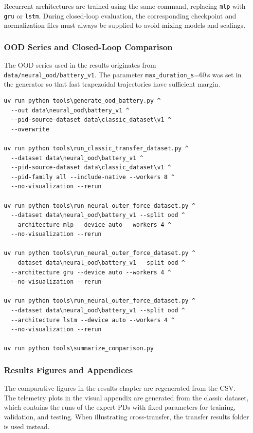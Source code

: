 Recurrent architectures are trained using the same command, replacing \texttt{mlp} with \texttt{gru} or \texttt{lstm}. During closed-loop evaluation, the corresponding checkpoint and normalization files must always be supplied to avoid mixing models and scalings.

\subsubsection*{OOD Series and Closed-Loop Comparison}

The OOD series used in the results originates from \texttt{data/neural\_ood/battery\_v1}. The parameter \texttt{max\_duration\_s}=60\,s was set in the generator so that fast trapezoidal trajectories have sufficient margin.

\begin{verbatim}
uv run python tools\generate_ood_battery.py ^
  --out data\neural_ood\battery_v1 ^
  --pid-source-dataset data\classic_dataset\v1 ^
  --overwrite

uv run python tools\run_classic_transfer_dataset.py ^
  --dataset data\neural_ood\battery_v1 ^
  --pid-source-dataset data\classic_dataset\v1 ^
  --pid-family all --include-native --workers 8 ^
  --no-visualization --rerun

uv run python tools\run_neural_outer_force_dataset.py ^
  --dataset data\neural_ood\battery_v1 --split ood ^
  --architecture mlp --device auto --workers 4 ^
  --no-visualization --rerun

uv run python tools\run_neural_outer_force_dataset.py ^
  --dataset data\neural_ood\battery_v1 --split ood ^
  --architecture gru --device auto --workers 4 ^
  --no-visualization --rerun

uv run python tools\run_neural_outer_force_dataset.py ^
  --dataset data\neural_ood\battery_v1 --split ood ^
  --architecture lstm --device auto --workers 4 ^
  --no-visualization --rerun

uv run python tools\summarize_comparison.py
\end{verbatim}

\subsubsection*{Results Figures and Appendices}

The comparative figures in the results chapter are regenerated from the CSV. The telemetry plots in the visual appendix are generated from the classic dataset, which contains the runs of the expert PDs with fixed parameters for training, validation, and testing. When illustrating cross-transfer, the transfer results folder is used instead.

